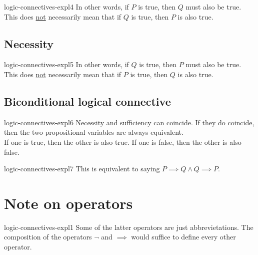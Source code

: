 \documentclass[preview]{standalone}
\begin{document}

\begin{snippet}{logic-connectives-expl4}
    In other words, if \(P\) is true, then \(Q\) must also be true.
    This does \underline{not} necessarily mean that if \(Q\) is true, then \(P\) is also true.
\end{snippet}


\subsection{Necessity}


\begin{snippet}{logic-connectives-expl5}
    In other words, if \(Q\) is true, then \(P\) must also be true.
    This does \underline{not} necessarily mean that if \(P\) is true, then \(Q\) is also true.
\end{snippet}


\subsection{Biconditional logical connective}

\begin{snippet}{logic-connectives-expl6}
    Necessity and sufficiency can coincide. If they do coincide,
    then the two propositional variables are always equivalent. \\
    If one is true, then the other is also true. If one is false, then the other is also false.
\end{snippet}


\begin{snippet}{logic-connectives-expl7}
    This is equivalent to saying \(P \implies Q \land Q \implies P\).
\end{snippet}

\section{Note on operators}

\begin{snippetnote}{logic-connectives-expl1}{}
    Some of the latter operators are just abbrevietations.
    The composition of the operators \(\lnot\) and \(\implies\)
    would suffice to define every other operator.
\end{snippetnote}


\end{document}
